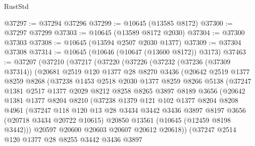 \begin{lexlean}{RustStd}
\begin{coremodule}
@37297 := @37294 @37296
@37299 := @10645 (@13585 @8172)
@37300 := @37297 @37299
@37303 := @10645 (@13589 @8172 @2030)
@37304 := @37300 @37303
@37308 := @10645 (@13594 @2507 @2030 @1377)
@37309 := @37304 @37308
@37314 := @10645 (@10646 (@10647 (@13600 @8172)) @3173)
@37463 := @37207
    (@37210
      (@37217
        (@37220
          (@37226
            (@37232
              (@37236 (@37309 @37314))
              (@20681
                @2519
                @120
                @1377
                @28
                @8270
                @3436
                (@20642
                  @2519
                  @1377
                  @8259
                  @8268
                  (@37238
                    @1453
                    @2518
                    @2030
                    @1377
                    @8259
                    @8266
                    @5138
                    (@37247
                      @1381
                      @2517
                      @1377
                      @2029
                      @8212
                      @8258
                      @8265
                      @3897
                      @8189
                      @3656
                      (@20642
                        @1381
                        @1377
                        @8204
                        @8210
                        (@37238
                          @1379
                          @121
                          @102
                          @1377
                          @8204
                          @8208
                          @4961
                          (@37247
                            @118
                            @120
                            @13
                            @28
                            @3434
                            @3442
                            @3436
                            @3897
                            @8197
                            @3656
                            (@20718 @3434 @20722 @10615)
                            @20850
                            @13561
                            (@10645 (@12459 @8198 @3442)))
                          @20597
                          @20600
                          @20603
                          @20607
                          @20612
                          @20618))
                      (@37247
                        @2514
                        @120
                        @1377
                        @28
                        @8255
                        @3442
                        @3436
                        @3897

\end{coremodule}
\end{lexlean}

